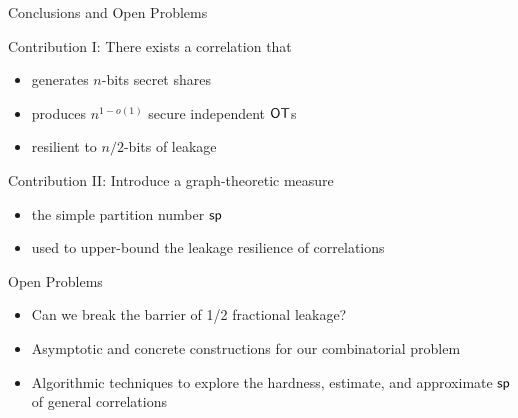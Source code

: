 \begin{frame}{Conclusions and Open Problems}

	{
		\begin{block} {Contribution I: There exists a correlation that}
			\begin{itemize}
				\item generates $ n $-bits secret shares
				\item produces $ n^{1-o(1)} $ secure independent $\OT$s
				\item resilient to $ n/2 $-bits of leakage 
			\end{itemize}
		\end{block}
		
		\pause
		
		\begin{block} {Contribution II: Introduce a graph-theoretic measure}
			\begin{itemize}
				\item the simple partition number $ \mathsf{sp} $
				\item used to upper-bound the leakage resilience of correlations 
			\end{itemize}
		\end{block}
		
	}

	\pause

	{
	\begin{block}{Open Problems}
		\begin{itemize}
			\item Can we break the barrier of 1/2 fractional leakage?
			\item Asymptotic and concrete constructions for our combinatorial problem
			\item Algorithmic techniques to explore the hardness, estimate, and approximate $ \mathsf{sp} $ of general correlations
		\end{itemize}		
	\end{block}
	}
\end{frame}